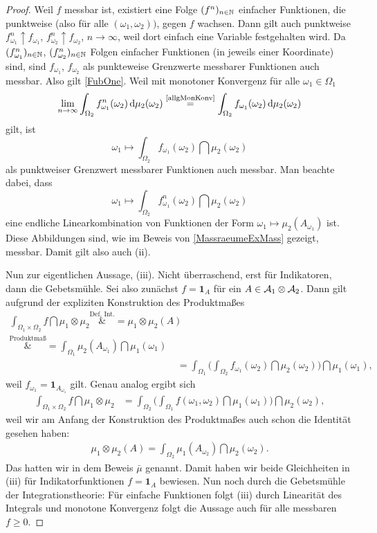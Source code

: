 \begin{proof}
	Weil $f$ messbar ist, existiert eine Folge $(f^n)_{n\in\mathbb{N}}$ einfacher Funktionen, die punktweise (also f\"ur alle $(\omega_1,\omega_2))$, gegen $f$ wachsen. Dann gilt  auch punktweise $f_{\omega_1}^n \uparrow f_{\omega_1}$, $f_{\omega_2}^n \uparrow f_{\omega_2}$, $n\to\infty$, weil dort einfach eine Variable festgehalten wird. Da $(f_{\omega_1}^n)_{n\in\mathbb{N}}$, $(f_{\omega_2}^n)_{n\in\mathbb{N}}$ Folgen einfacher Funktionen (in jeweils einer Koordinate) sind, sind $f_{\omega_1}$, $f_{\omega_2}$ als punkteweise Grenzwerte messbarer Funktionen auch messbar. Also gilt \ref{FubOne}. Weil mit monotoner Konvergenz f\"ur alle $\omega_1\in \Omega_1$
	 \[\lim_{n\to\infty} \int_{\Omega_2} f_{\omega_1}^n(\omega_2) \, \mathrm{d} \mu_2(\omega_2) \overset{\text{\ref{allgMonKonv}}}{=} \int_{\Omega_2} f_{\omega_1}(\omega_2) \, \mathrm{d} \mu_2(\omega_2)\]
	gilt, ist \[ \omega_1 \mapsto \int_{\Omega_2} f_{\omega_1}(\omega_2) \dint \mu_2(\omega_2)  \] als punktweiser Grenzwert messbarer Funktionen auch messbar. Man beachte dabei, dass
		\[ \omega_1\mapsto \int_{\Omega_2} f_{\omega_1}^n(\omega_2) \dint \mu_2(\omega_2) \] eine endliche Linearkombination von Funktionen der Form $\omega_1 \mapsto \mu_2(A_{\omega_1})$ ist. Diese Abbildungen sind, wie im Beweis von \ref{MassraeumeExMass} gezeigt, messbar. Damit gilt also auch (ii).\smallskip
	
	Nun zur eigentlichen Aussage, (iii). Nicht \"uberraschend, erst f\"ur Indikatoren, dann die Gebetsm\"uhle. Sei also zun\"achst $f = \mathbf{1}_A$ f\"ur ein $A \in \mathcal{A}_1 \otimes \mathcal{A}_2$. Dann gilt aufgrund der expliziten Konstruktion des Produktma\ss es
		\begin{align*}
			\int_{\Omega_1 \times \Omega_2} f \dint \mu_1\otimes \mu_2 
			 \overset{\text{Def. Int.}}&{=} \mu_1\otimes \mu_2(A)\\
			 \overset{\text{Produktma\ss}}&{=} \int_{\Omega_1} \mu_2(A_{\omega_1}) \dint \mu_1(\omega_1)\\
			& =\int_{\Omega_1} \Big( \int_{\Omega_2} f_{\omega_1}(\omega_2) \dint \mu_2(\omega_2) \Big) \dint \mu_1(\omega_1),
		\end{align*}
		weil $f_{\omega_1}=\mathbf{1}_{A_{\omega_1}}$ gilt. Genau analog ergibt sich
		\begin{align*}
			\int_{\Omega_1 \times \Omega_2} f \dint \mu_1\otimes \mu_2
			& = 	\int_{\Omega_2} \Big( \int_{\Omega_1} f(\omega_1,\omega_2) \dint \mu_1(\omega_1) \Big) \dint \mu_2(\omega_2),
		\end{align*}
	weil wir am Anfang der Konstruktion des Produktma\ss es auch schon die Identit\"at gesehen haben:
	\begin{align*}
		\mu_1\otimes \mu_2(A)=  \int_{\Omega_2} \mu_1(A_{\omega_2}) \dint \mu_2(\omega_2).
	\end{align*}
	Das hatten wir in dem Beweis $\bar \mu$ genannt. Damit haben wir beide Gleichheiten in (iii) f\"ur Indikatorfunktionen $f = \mathbf{1}_A$ bewiesen. Nun noch durch die Gebetsm\"uhle der Integrationstheorie: F\"ur einfache Funktionen folgt (iii) durch Linearit\"at des Integrals und monotone Konvergenz folgt die Aussage auch f\"ur alle messbaren $f\geq 0$.
\end{proof}

